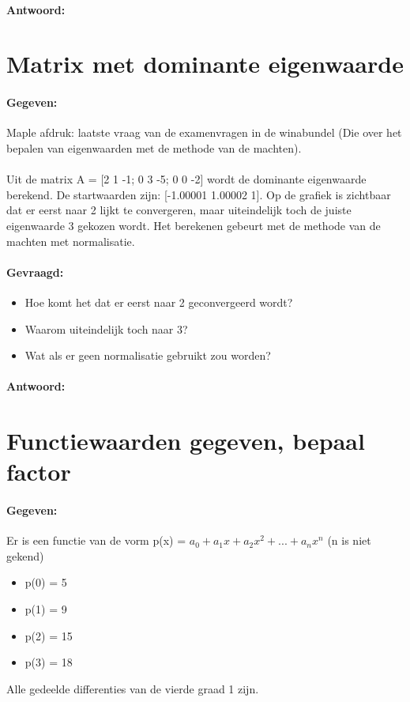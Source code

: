 \documentclass[12pt]{article}
\begin{document}
\paragraph{Antwoord:}

\newpage

\section{Matrix met dominante eigenwaarde}
\paragraph{Gegeven:}
Maple afdruk: laatste vraag van de examenvragen in de winabundel (Die over het bepalen van eigenwaarden met de methode van de machten).\\
\\
Uit de matrix A = [2 1 -1; 0 3 -5; 0 0 -2] wordt de dominante eigenwaarde berekend. De startwaarden zijn: [-1.00001 1.00002 1]. Op de grafiek is zichtbaar dat er eerst naar 2 lijkt te convergeren, maar uiteindelijk toch de juiste eigenwaarde 3 gekozen wordt. Het berekenen gebeurt met de methode van de machten met normalisatie.
\paragraph{Gevraagd:}
\begin{itemize}
	\item Hoe komt het dat er eerst naar 2 geconvergeerd wordt?
	\item Waarom uiteindelijk toch naar 3?
	\item Wat als er geen normalisatie gebruikt zou worden?
\end{itemize}
\paragraph{Antwoord:}

\newpage

\section{Functiewaarden gegeven, bepaal factor}
\paragraph{Gegeven:}
Er is een functie van de vorm p(x) = $a_0 + a_1x + a_2x^2 + ... +a_nx^n$ (n is niet gekend)
\begin{itemize}
	\item p(0) = 5
	\item p(1) = 9
	\item p(2) = 15
	\item p(3) = 18
\end{itemize}
Alle gedeelde differenties van de vierde graad 1 zijn.
\end{document}
